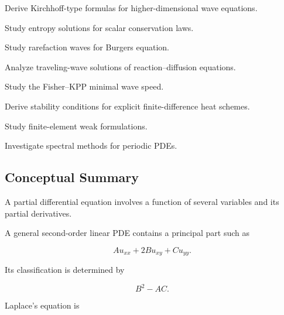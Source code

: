 \begin{exercise}[4]
Derive Kirchhoff-type formulas for higher-dimensional wave equations.
\end{exercise}

\begin{exercise}[4]
Study entropy solutions for scalar conservation laws.
\end{exercise}

\begin{exercise}[4]
Study rarefaction waves for Burgers equation.
\end{exercise}

\begin{exercise}[4]
Analyze traveling-wave solutions of reaction--diffusion equations.
\end{exercise}

\begin{exercise}[4]
Study the Fisher--KPP minimal wave speed.
\end{exercise}

\begin{exercise}[4]
Derive stability conditions for explicit finite-difference heat schemes.
\end{exercise}

\begin{exercise}[4]
Study finite-element weak formulations.
\end{exercise}

\begin{exercise}[4]
Investigate spectral methods for periodic PDEs.
\end{exercise}

\subsection{Conceptual Summary}
\label{subsec:pde-summary}

A partial differential equation involves a function of several variables
and its partial derivatives.

A general second-order linear PDE contains a principal part such as

\[
\boxed{
A u_{xx}
+
2B u_{xy}
+
C u_{yy}.
}
\]

Its classification is determined by

\[
\boxed{
B^2-AC.
}
\]

Laplace's equation is

